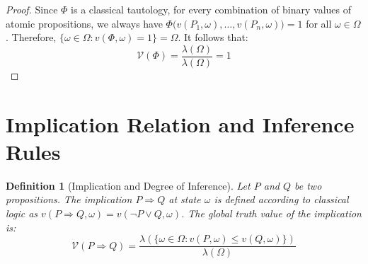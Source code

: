 \documentclass[a4paper,12pt, twoside]{memoir}
\newtheorem{definition}{Definition}[chapter]
\newcommand{\ddclmd}{\mathcal{V}} %
\begin{document}
\begin{proof}
	Since $\Phi$ is a classical tautology, for every combination of binary values of atomic propositions, we always have $\Phi\big(v(P_1, \omega), \dots, v(P_n, \omega)\big) = 1$ for all $\omega \in \Omega$.
	Therefore, $\{\omega \in \Omega : v(\Phi, \omega) = 1\} = \Omega$. It follows that:
	\[
		\ddclmd(\Phi) = \frac{\lambda(\Omega)}{\lambda(\Omega)} = 1
	\]
\end{proof}

\section{Implication Relation and Inference Rules}

\begin{definition}[Implication and Degree of Inference]
	Let $P$ and $Q$ be two propositions. The implication $P \Rightarrow Q$ at state $\omega$ is defined according to classical logic as $v(P \Rightarrow Q, \omega) = v(\neg P \lor Q, \omega)$. The global truth value of the implication is:
	\[
		\ddclmd(P \Rightarrow Q) = \frac{\lambda(\{\omega \in \Omega : v(P, \omega) \le v(Q, \omega)\})}{\lambda(\Omega)}
	\]
\end{definition}
\end{document}
